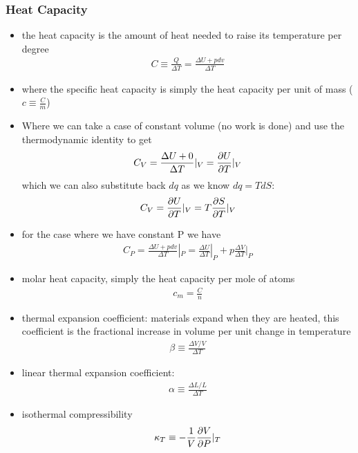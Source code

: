 \subsubsection{Heat Capacity}
\begin{itemize}
	\item the heat capacity is the amount of heat needed to raise its temperature per degree
	      \begin{align}
		      C \equiv \frac{Q}{\Delta T} = \frac{\Delta U + p dv}{\Delta T}
	      \end{align}
	\item where the specific heat capacity is simply the heat capacity per unit of mass ($c \equiv \frac{C}{m}$)
	\item Where we can take a case of constant volume (no work is done) and use the thermodynamic
	      identity to get
	      \begin{align}
		      C_V = \frac{\Delta U + 0}{\Delta T}|_V = \pdv{U}{T}|_V
	      \end{align}
	      which we can also substitute back $dq$ as we know $dq = T dS$:
	      \begin{align}
		      C_V = \pdv{U}{T}|_V = T \pdv{S}{T}|_V
	      \end{align}
	\item for the case where we have constant P we have
	      \begin{align}
		      C_P = \frac{\Delta U + pdv}{\Delta T}|_P = \frac{\Delta U}{\Delta T}|_P + p \frac{\Delta V}{\Delta T}|_P
	      \end{align}
	\item molar heat capacity, simply the heat capacity per mole of atoms
	      \begin{align}
		      c_m = \frac{C}{n}
	      \end{align}
	\item thermal expansion coefficient: materials expand when they are heated, this coefficient is the fractional
	      increase in volume per unit change in temperature
	      \begin{align}
		      \beta \equiv \frac{\Delta V/V}{\Delta T}
	      \end{align}
	\item linear thermal expansion coefficient:
	      \begin{align}
		      \alpha \equiv \frac{\Delta L /L}{\Delta T}
	      \end{align}
	\item isothermal compressibility
	      \begin{align}
		      \kappa_T \equiv -\frac{1}{V} \pdv{V}{P}|_T
	      \end{align}
\end{itemize}

